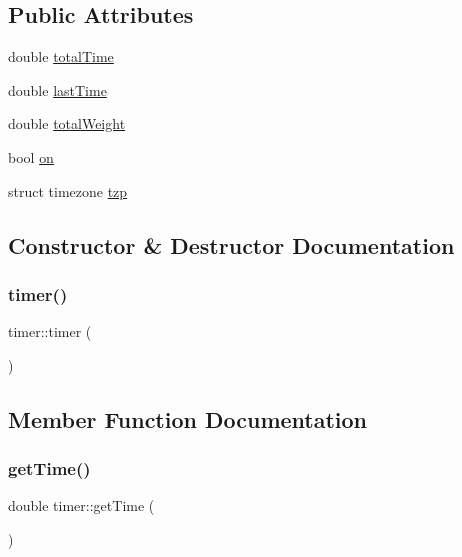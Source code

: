 \subsection*{Public Attributes}
\begin{DoxyCompactItemize}
\item 
double \mbox{\hyperlink{structtimer_a0c1f154ef20ab5ae19b1e2c8cec63375}{total\+Time}}
\item 
double \mbox{\hyperlink{structtimer_a869b4cac18d1234c721c8314514914a4}{last\+Time}}
\item 
double \mbox{\hyperlink{structtimer_ab294a219339c97d333c0d4e11bf8636b}{total\+Weight}}
\item 
bool \mbox{\hyperlink{structtimer_ad3b99f09a2fbfa987e9f535879e94a16}{on}}
\item 
struct timezone \mbox{\hyperlink{structtimer_a19827c3cd19867fd078b3860e17d0754}{tzp}}
\end{DoxyCompactItemize}


\subsection{Constructor \& Destructor Documentation}
\mbox{\label{structtimer_ae536faf93e02933cd025a6fbcbb48d0a}} 
\subsubsection{\texorpdfstring{timer()}{timer()}}
{\footnotesize\ttfamily timer\+::timer (\begin{DoxyParamCaption}{ }\end{DoxyParamCaption})\hspace{0.3cm}{\ttfamily [inline]}}



\subsection{Member Function Documentation}
\mbox{\label{structtimer_a597befd9cd3b4d37419f91e5380e00ae}} 
\subsubsection{\texorpdfstring{getTime()}{getTime()}}
{\footnotesize\ttfamily double timer\+::get\+Time (\begin{DoxyParamCaption}{ }\end{DoxyParamCaption})\hspace{0.3cm}{\ttfamily [inline]}}

